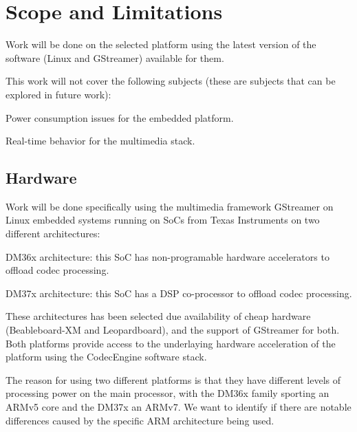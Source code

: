 \section{Scope and Limitations}
Work will be done on the selected platform using the latest version of the software (Linux and GStreamer) available for them.

This work will not cover the following subjects (these are subjects that can be explored in future work):
\begin{itemize*}
\item Power consumption issues for the embedded platform.
\item Real-time behavior for the multimedia stack.
\end{itemize*}

\subsection{Hardware}
Work will be done specifically using the multimedia framework GStreamer on Linux embedded systems running on \acp{SoC} from Texas Instruments on two different architectures:
\begin{itemize*}
\item DM36x architecture: this \ac{SoC} has non-programable hardware accelerators to offload codec processing.
\item DM37x architecture: this \ac{SoC} has a \ac{DSP} co-processor to offload codec processing.
\end{itemize*}

These architectures has been selected due availability of cheap hardware (Beableboard-XM and Leopardboard), and the support of GStreamer for both. Both platforms provide access to the underlaying hardware acceleration of the platform using the CodecEngine software stack\cite{Preissig:2006fk}.

The reason for using two different platforms is that they have different levels of processing power on the main processor, with the DM36x family sporting an ARMv5 core and the DM37x an ARMv7. We want to identify if there are notable differences caused by the specific ARM architecture being used.

